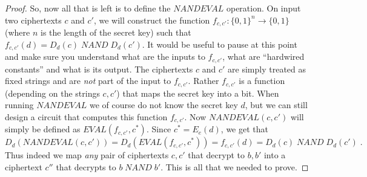 \begin{proof}
So, now all that is left is to define the
\(\ensuremath{\mathit{NANDEVAL}}\) operation. On input two ciphertexts
\(c\) and \(c'\), we will construct the function
\(f_{c,c'}:\{0,1\}^n\rightarrow\{0,1\}\) (where \(n\) is the length of
the secret key) such that
\(f_{c,c'}(d)=D_d(c) \;\ensuremath{\mathit{NAND}}\; D_d(c')\). It would
be useful to pause at this point and make sure you understand what are
the inputs to \(f_{c,c'}\), what are ``hardwired constants'' and what is
its output. The ciphertexts \(c\) and \(c'\) are simply treated as fixed
strings and are \emph{not} part of the input to \(f_{c,c'}\). Rather
\(f_{c,c'}\) is a function (depending on the strings \(c,c'\)) that maps
the secret key into a bit. When running
\(\ensuremath{\mathit{NANDEVAL}}\) we of course do not know the secret
key \(d\), but we can still design a circuit that computes this function
\(f_{c,c'}\). Now \(\ensuremath{\mathit{NANDEVAL}}(c,c')\) will simply
be defined as \(\ensuremath{\mathit{EVAL}}(f_{c,c'},c^*)\). Since
\(c^* = E_e(d)\), we get that
\begin{equation*}
D_d(\ensuremath{\mathit{NANDEVAL}}(c,c'))= D_d(\ensuremath{\mathit{EVAL}}(f_{c,c'},c^*))=f_{c,c'}(d) =D_d(c) \;\ensuremath{\mathit{NAND}}\; D_d(c') \;.
\end{equation*}
Thus indeed we map \emph{any} pair of ciphertexts \(c,c'\) that decrypt
to \(b,b'\) into a ciphertext \(c''\) that decrypts to
\(b \;\ensuremath{\mathit{NAND}}\; b'\). This is all that we needed to
prove.

\end{proof}

